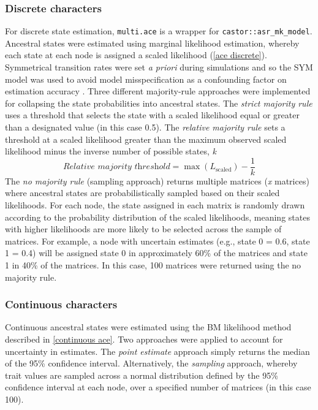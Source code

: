 \documentclass[titlepage]{article}
\begin{document}
\subsubsection{Discrete characters}
For discrete state estimation, \texttt{multi.ace} is a wrapper for \texttt{castor::asr\_mk\_model}.  
Ancestral states were estimated using marginal likelihood estimation, whereby each state at each node is assigned a scaled likelihood (\autoref{ace discrete}).
Symmetrical transition rates were set \textit{a priori} during simulations and so the SYM model was used to avoid model misspecification as a confounding factor on estimation accuracy \citep{keating2023best}.
Three different majority-rule approaches were implemented for collapsing the state probabilities into ancestral states.
The \textit{strict majority rule} uses a threshold that selects the state with a scaled likelihood equal or greater than a designated value (in this case 0.5).
The \textit{relative majority rule} sets a threshold at a scaled likelihood greater than the maximum observed scaled likelihood minus the inverse number of possible states, \textit{k}
\[
\textit{Relative majority threshold} = \max(L_{\text{scaled}}) - \frac{1}{k}
\]
The \textit{no majority rule} (sampling approach) returns multiple matrices (\textit{x} matrices) where ancestral states are probabilistically sampled based on their scaled likelihoods. 
For each node, the state assigned in each matrix is randomly drawn according to the probability distribution of the scaled likelihoods, meaning states with higher likelihoods are more likely to be selected across the sample of matrices. 
For example, a node with uncertain estimates (e.g., state 0 = 0.6, state 1 = 0.4) will be assigned state 0 in approximately 60\% of the matrices and state 1 in 40\% of the matrices.
In this case, 100 matrices were returned using the no majority rule.

\subsubsection{Continuous characters}
Continuous ancestral states were estimated using the BM likelihood method described in \autoref{continuous ace}.
Two approaches were applied to account for uncertainty in estimates.
The \textit{point estimate} approach simply returns the median of the 95\% confidence interval.
Alternatively, the \textit{sampling} approach, whereby trait values are sampled across a normal distribution defined by the 95\% confidence interval at each node, over a specified number of matrices (in this case 100).
\end{document}
